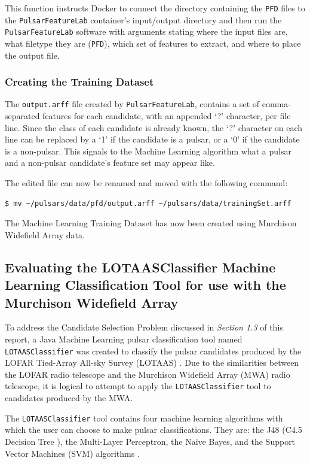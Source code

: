 \documentclass{article}
\begin{document}
This function instructs Docker to connect the directory containing the \verb|PFD| files to the \verb|PulsarFeatureLab| container's input/output directory and then run the \verb|PulsarFeatureLab| software with arguments stating where the input files are, what filetype they are (\verb|PFD|), which set of features to extract, and where to place the output file.

\subsubsection{Creating the Training Dataset}

The \verb|output.arff| file created by \verb|PulsarFeatureLab|, contains a set of comma-separated features for each candidate, with an appended `?' character, per file line. Since the class of each candidate is already known, the `?' character on each line can be replaced by a `1' if the candidate is a pulsar, or a `0' if the candidate is a non-pulsar. This signals to the Machine Learning algorithm what a pulsar and a non-pulsar candidate's feature set may appear like.

The edited file can now be renamed and moved with the following command:

\begin{lstlisting}[numbers=none]
$ mv ~/pulsars/data/pfd/output.arff ~/pulsars/data/trainingSet.arff
\end{lstlisting}

The Machine Learning Training Dataset has now been created using Murchison Widefield Array data.
    
\subsection{Evaluating the LOTAASClassifier Machine Learning Classification Tool for use with the Murchison Widefield Array}

To address the Candidate Selection Problem discussed in \emph{Section 1.3} of this report, a Java Machine Learning pulsar classification tool named \verb|LOTAASClassifier| was created to classify the pulsar candidates produced by the LOFAR Tied-Array All-sky Survey (LOTAAS) \autocite{lyon}. Due to the similarities between the LOFAR radio telescope and the Murchison Widefield Array (MWA) radio telescope, it is logical to attempt to apply the \verb|LOTAASClassifier| tool to candidates produced by the MWA.

The \verb|LOTAASClassifier| tool contains four machine learning algorithms with which the user can choose to make pulsar classifications. They are: the J48 (C4.5 Decision Tree \autocite{quinlan}), the Multi-Layer Perceptron, the Naive Bayes, and the Support Vector Machines (SVM) algorithms \autocite{lyon}.
\end{document}
